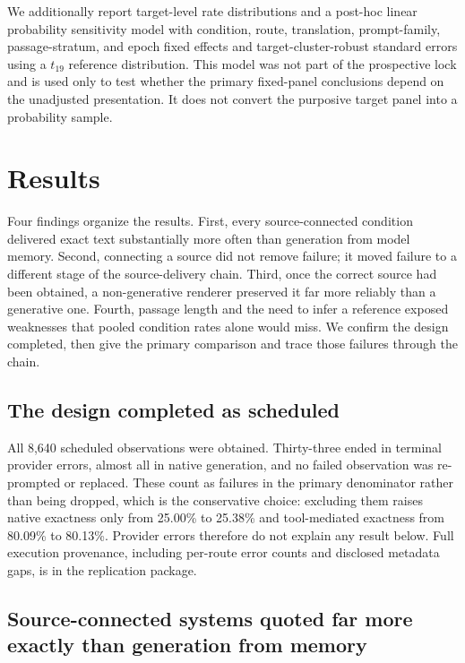 \documentclass[11pt]{article}
\begin{document}
We additionally report target-level rate distributions and a post-hoc linear
probability sensitivity model with condition, route, translation, prompt-family,
passage-stratum, and epoch fixed effects and target-cluster-robust standard
errors using a $t_{19}$ reference distribution. This model was not part of the
prospective lock and is used only to test whether the primary fixed-panel
conclusions depend on the unadjusted presentation. It does not convert the
purposive target panel into a probability sample.

\section{Results}
\label{sec:results}

Four findings organize the results. First, every source-connected condition
delivered exact text substantially more often than generation from model
memory. Second, connecting a source did not remove failure; it moved failure to
a different stage of the source-delivery chain. Third, once the correct source
had been obtained, a non-generative renderer preserved it far more reliably
than a generative one. Fourth, passage length and the need to infer a reference
exposed weaknesses that pooled condition rates alone would miss. We confirm the
design completed, then give the primary comparison and trace those failures
through the chain.

\subsection{The design completed as scheduled}

All 8,640 scheduled observations were obtained. Thirty-three ended in terminal
provider errors, almost all in native generation, and no failed observation was
re-prompted or replaced. These count as failures in the primary denominator
rather than being dropped, which is the conservative choice: excluding them
raises native exactness only from 25.00\% to 25.38\% and tool-mediated
exactness from 80.09\% to 80.13\%. Provider errors therefore do not explain
any result below. Full execution provenance, including per-route error counts
and disclosed metadata gaps, is in the replication package.

\subsection{Source-connected systems quoted far more exactly than generation from memory}
\end{document}
